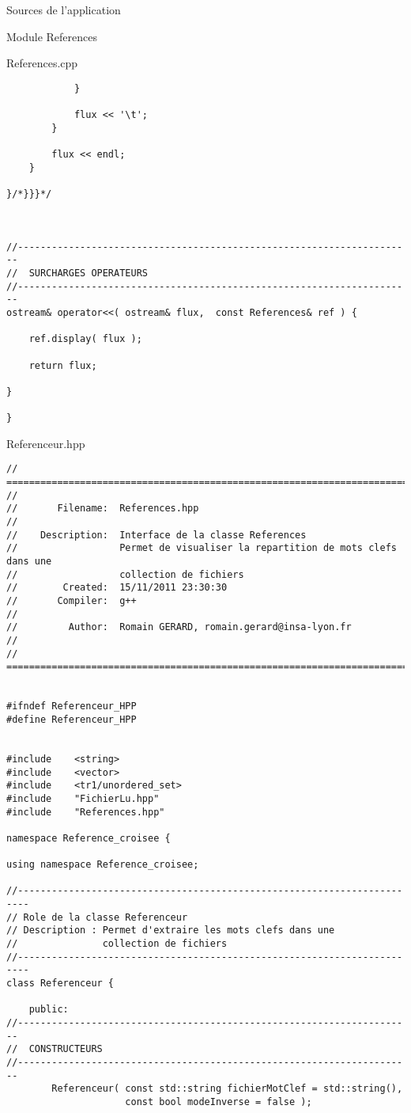 \documentclass{article}
\begin{document}
\begin{section}{Sources de l'application}
\begin{subsection}{Module References}
\begin{paragraph}{References.cpp}
\begin{verbatim}
            }

            flux << '\t';
        }

        flux << endl;
    }

}/*}}}*/



//----------------------------------------------------------------------
//  SURCHARGES OPERATEURS
//----------------------------------------------------------------------
ostream& operator<<( ostream& flux,  const References& ref ) {

    ref.display( flux );

    return flux;

}

}
  \end{verbatim}

  \end{paragraph}
  \end{subsection}




\newpage
  \begin{paragraph}{Referenceur.hpp}
   \begin{verbatim}
// =====================================================================================
//
//       Filename:  References.hpp
//
//    Description:  Interface de la classe References
//                  Permet de visualiser la repartition de mots clefs dans une
//                  collection de fichiers
//        Created:  15/11/2011 23:30:30
//       Compiler:  g++
//
//         Author:  Romain GERARD, romain.gerard@insa-lyon.fr
//
// =====================================================================================


#ifndef Referenceur_HPP
#define Referenceur_HPP


#include    <string>
#include    <vector>
#include    <tr1/unordered_set>
#include    "FichierLu.hpp"
#include    "References.hpp"

namespace Reference_croisee {

using namespace Reference_croisee;

//------------------------------------------------------------------------
// Role de la classe Referenceur
// Description : Permet d'extraire les mots clefs dans une
//               collection de fichiers
//------------------------------------------------------------------------
class Referenceur {

    public:
//----------------------------------------------------------------------
//  CONSTRUCTEURS
//----------------------------------------------------------------------
        Referenceur( const std::string fichierMotClef = std::string(),
                     const bool modeInverse = false );


\end{verbatim}
\end{paragraph}
\end{section}
\end{document}
